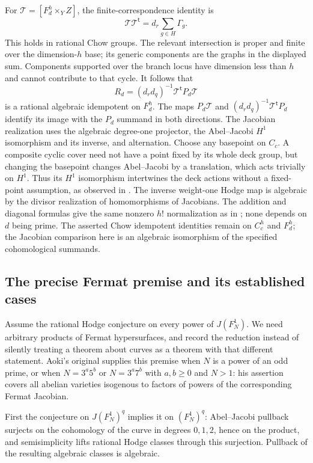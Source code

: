 \documentclass[11pt]{article}
\theoremstyle{definition}
\begin{document}
For $\mathcal T=[F_d^h\times_Y Z]$, the finite-correspondence identity is
\[
 \mathcal T\mathcal T^{\mathsf t}
   =d_r\sum_{g\in H}\Gamma_g.
\]
This holds in rational Chow groups. The relevant intersection is proper
and finite over the dimension-$h$ base; its generic components are the
graphs in the displayed sum. Components supported over the branch locus
have dimension less than $h$ and cannot contribute to that cycle.
It follows that
\[
 R_d=(d_r d_q)^{-1}\mathcal T^{\mathsf t}P_d\mathcal T
\]
is a rational algebraic idempotent on $F_d^h$. The maps
$P_d\mathcal T$ and $(d_r d_q)^{-1}\mathcal T^{\mathsf t}P_d$
identify its image with the $P_d$ summand in both directions.
The Jacobian realization uses the algebraic degree-one projector,
the Abel--Jacobi $H^1$ isomorphism and its inverse, and alternation.
Choose any basepoint on $C_c$. A composite cyclic cover need not have
a point fixed by its whole deck group, but changing the basepoint
changes Abel--Jacobi by a translation, which acts trivially on $H^1$.
Thus its $H^1$ isomorphism intertwines the deck actions without a
fixed-point assumption, as observed in
\cite[Remark~1.4, pp.~6--7]{Schoen}. The inverse weight-one Hodge map is algebraic
by the divisor realization of homomorphisms of Jacobians. The addition
and diagonal formulas give the same nonzero $h!$ normalization as in
\cite{Fermat}; none depends on $d$ being prime. The asserted Chow
idempotent identities remain on $C_c^h$ and $F_d^h$; the Jacobian
comparison here is an algebraic isomorphism of the specified
cohomological summands.

\subsection{The precise Fermat premise and its established cases}
Assume the rational Hodge conjecture on every power of $J(F_N^1)$.
We need arbitrary products of Fermat hypersurfaces, and record the
reduction instead of silently treating a theorem about curves as a
theorem with that different statement. Aoki's original
\cite[Theorem 0.1, p.~177]{Aoki2000} supplies this premise when $N$
is a power of an odd prime, or when $N=3^a5^b$ or $N=3^a7^b$
with $a,b\geq0$ and $N>1$: his assertion covers all abelian varieties
isogenous to factors of powers of the corresponding Fermat Jacobian.

First the conjecture on $J(F_N^1)^q$ implies it on $(F_N^1)^q$:
Abel--Jacobi pullback surjects on the cohomology of the curve in degrees
$0,1,2$, hence on the product, and semisimplicity lifts rational Hodge
classes through this surjection. Pullback of the resulting algebraic
classes is algebraic.
\end{document}
